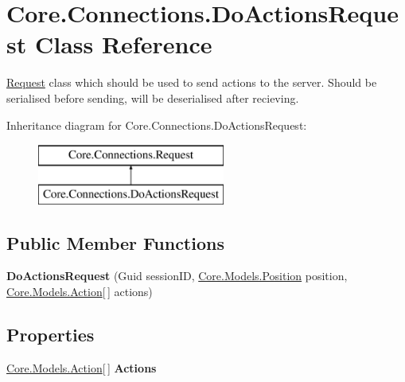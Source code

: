 \hypertarget{classCore_1_1Connections_1_1DoActionsRequest}{\section{Core.\-Connections.\-Do\-Actions\-Request Class Reference}
\label{classCore_1_1Connections_1_1DoActionsRequest}
}


\hyperlink{classCore_1_1Connections_1_1Request}{Request} class which should be used to send actions to the server. Should be serialised before sending, will be deserialised after recieving.  


Inheritance diagram for Core.\-Connections.\-Do\-Actions\-Request\-:\begin{figure}[H]
\begin{center}
\leavevmode
\includegraphics[height=2.000000cm]{classCore_1_1Connections_1_1DoActionsRequest}
\end{center}
\end{figure}
\subsection*{Public Member Functions}
\begin{DoxyCompactItemize}
\item 
\hypertarget{classCore_1_1Connections_1_1DoActionsRequest_a1298901ab5ab91c539caa9d5cb9115e2}{{\bfseries Do\-Actions\-Request} (Guid session\-I\-D, \hyperlink{classCore_1_1Models_1_1Position}{Core.\-Models.\-Position} position, \hyperlink{classCore_1_1Models_1_1Action}{Core.\-Models.\-Action}\mbox{[}$\,$\mbox{]} actions)}\label{classCore_1_1Connections_1_1DoActionsRequest_a1298901ab5ab91c539caa9d5cb9115e2}

\end{DoxyCompactItemize}
\subsection*{Properties}
\begin{DoxyCompactItemize}
\item 
\hypertarget{classCore_1_1Connections_1_1DoActionsRequest_a25fbe4ad38c5390024d7cb616507957c}{\hyperlink{classCore_1_1Models_1_1Action}{Core.\-Models.\-Action}\mbox{[}$\,$\mbox{]} {\bfseries Actions}}\label{classCore_1_1Connections_1_1DoActionsRequest_a25fbe4ad38c5390024d7cb616507957c}

\end{DoxyCompactItemize}
